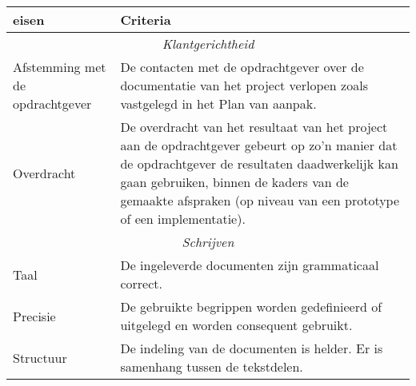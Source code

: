\begin{center}
    \small\sf
    \begin{tabular}{|p{7em}|p{23em}|}
	\hline {\bf eisen} & {\bf Criteria}\\
	\hline
	\multicolumn{2}{|c|}{\emph{Klantgerichtheid}}\\\hline
	Afstemming met de opdrachtgever & De contacten met de opdrachtgever over de
	documentatie van het project verlopen zoals vastgelegd in het Plan van aanpak.
	\\\hline
	Overdracht & De overdracht van het resultaat van het project aan de opdrachtgever
	gebeurt op zo’n manier dat de opdrachtgever de resultaten daadwerkelijk kan gaan
	gebruiken, binnen de kaders van de gemaakte afspraken (op niveau van een prototype
	of een implementatie).
	\\\hline
	\multicolumn{2}{|c|}{\emph{Schrijven}}\\\hline
	Taal & De ingeleverde documenten zijn grammaticaal correct.
	\\\hline
	Precisie & De gebruikte begrippen worden gedefinieerd of uitgelegd en
	worden consequent gebruikt.
	\\\hline
	Structuur & De indeling van de documenten is helder. Er is samenhang tussen de tekstdelen.
	\\\hline
    \end{tabular}
    \label{fig: 3d-beoordelingscriteria}
\end{center}
